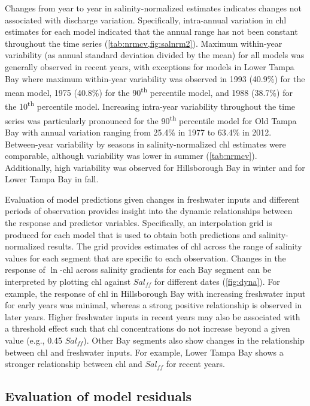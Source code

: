 \documentclass{svjour3}\usepackage[]{graphicx}\usepackage[]{color}
\newcommand{\nine}{90\textsuperscript{th} percentile }
\newcommand{\ten}{10\textsuperscript{th} percentile }
\begin{document}
Changes from year to year in salinity-normalized estimates indicates changes not associated with discharge variation.  Specifically, intra-annual variation in \ac{chl} estimates for each model indicated that the annual range has not been constant throughout the time series (\cref{tab:nrmcv,fig:salnrm2}).  Maximum within-year variability (as annual standard deviation divided by the mean) for all models was generally observed in recent years, with exceptions for models in Lower Tampa Bay where maximum within-year variability was observed in 1993 (40.9\%) for the mean model, 1975 (40.8\%) for the \nine model, and 1988 (38.7\%) for the \ten model.  Increasing intra-year variability throughout the time series was particularly pronounced for the \nine model for Old Tampa Bay with annual variation ranging from 25.4\% in 1977  to 63.4\% in 2012.  Between-year variability by seasons in salinity-normalized \ac{chl} estimates were comparable, although variability was lower in summer (\cref{tab:nrmcv}).  Additionally, high variability was observed for Hillsborough Bay in winter and for Lower Tampa Bay in fall.

Evaluation of model predictions given changes in freshwater inputs and different periods of observation provides insight into the dynamic relationships between the response and predictor variables. Specifically, an interpolation grid is produced for each model that is used to obtain both predictions and salinity-normalized results.  The grid provides estimates of \ac{chl} across the range of salinity values for each segment that are specific to each observation.  Changes in the response of $\ln$-\ac{chl} across salinity gradients for each Bay segment can be interpreted by plotting \ac{chl} against $Sal_{ff}$ for different dates (\cref{fig:dyna}).  For example, the response of \ac{chl} in Hillsborough Bay with increasing freshwater input for early years was minimal, whereas a strong positive relationship is observed in later years.  Higher freshwater inputs in recent years may also be associated with a threshold effect such that \ac{chl} concentrations do not increase beyond a given value (e.g., 0.45 $Sal_{ff}$).  Other Bay segments also show changes in the relationship between \ac{chl} and freshwater inputs.  For example, Lower Tampa Bay shows a stronger relationship between \ac{chl} and $Sal_{ff}$ for recent years. 

\subsection{Evaluation of model residuals}
\end{document}
